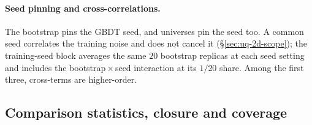 \paragraph{Seed pinning and cross-correlations.} The bootstrap pins the GBDT seed, and universes pin the seed too. A common seed correlates the training noise and does not cancel it (\S\ref{sec:uq-2d-scope}); the training-seed block averages the same $20$ bootstrap replicas at each seed setting and includes the bootstrap\,$\times$\,seed interaction at its $1/20$ share. Among the first three, cross-terms are higher-order.

\subsection{Comparison statistics, closure and coverage}\label{recsec:methods-comparison}

